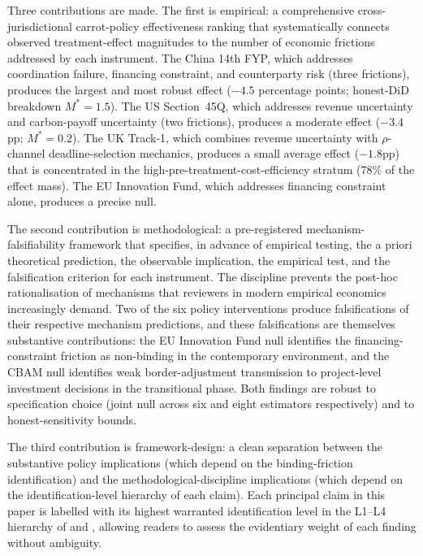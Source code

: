 \documentclass[12pt,a4paper]{article}
\theoremstyle{plain}
\theoremstyle{definition}
\begin{document}
Three contributions are made. The first is empirical: a comprehensive cross-jurisdictional carrot-policy effectiveness ranking that systematically connects observed treatment-effect magnitudes to the number of economic frictions addressed by each instrument. The China 14th FYP, which addresses coordination failure, financing constraint, and counterparty risk (three frictions), produces the largest and most robust effect ($-4.5$ percentage points; honest-DiD breakdown $M^{*} = 1.5$). The US Section~45Q, which addresses revenue uncertainty and carbon-payoff uncertainty (two frictions), produces a moderate effect ($-3.4$pp; $M^{*} = 0.2$). The UK Track-1, which combines revenue uncertainty with $\rho$-channel deadline-selection mechanics, produces a small average effect ($-1.8$pp) that is concentrated in the high-pre-treatment-cost-efficiency stratum (78\% of the effect mass). The EU Innovation Fund, which addresses financing constraint alone, produces a precise null.

The second contribution is methodological: a pre-registered mechanism-falsifiability framework that specifies, in advance of empirical testing, the a priori theoretical prediction, the observable implication, the empirical test, and the falsification criterion for each instrument. The discipline prevents the post-hoc rationalisation of mechanisms that reviewers in modern empirical economics increasingly demand. Two of the six policy interventions produce falsifications of their respective mechanism predictions, and these falsifications are themselves substantive contributions: the EU Innovation Fund null identifies the financing-constraint friction as non-binding in the contemporary environment, and the CBAM null identifies weak border-adjustment transmission to project-level investment decisions in the transitional phase. Both findings are robust to specification choice (joint null across six and eight estimators respectively) and to honest-sensitivity bounds.

The third contribution is framework-design: a clean separation between the substantive policy implications (which depend on the binding-friction identification) and the methodological-discipline implications (which depend on the identification-level hierarchy of each claim). Each principal claim in this paper is labelled with its highest warranted identification level in the L1--L4 hierarchy of \cite{angrist2010credibility} and \cite{deaton2018understanding}, allowing readers to assess the evidentiary weight of each finding without ambiguity.
\end{document}
